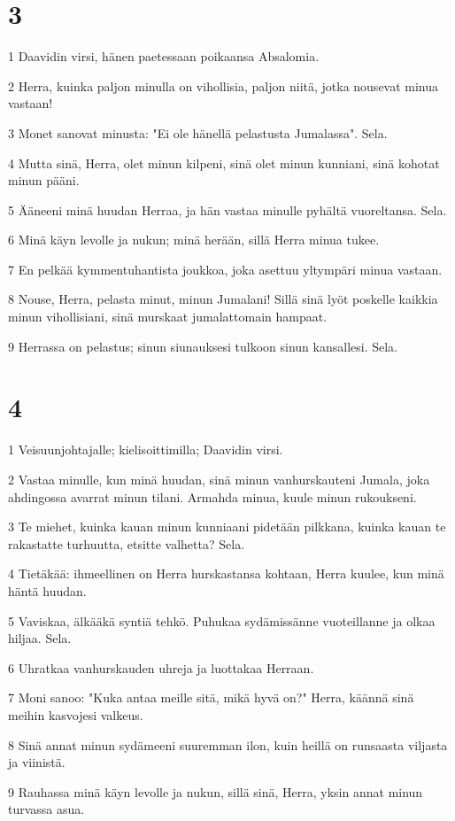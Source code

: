 \chapter{3}

\par 1 Daavidin virsi, hänen paetessaan poikaansa Absalomia.
\par 2 Herra, kuinka paljon minulla on vihollisia, paljon niitä, jotka nousevat minua vastaan!
\par 3 Monet sanovat minusta: "Ei ole hänellä pelastusta Jumalassa". Sela.
\par 4 Mutta sinä, Herra, olet minun kilpeni, sinä olet minun kunniani, sinä kohotat minun pääni.
\par 5 Ääneeni minä huudan Herraa, ja hän vastaa minulle pyhältä vuoreltansa. Sela.
\par 6 Minä käyn levolle ja nukun; minä herään, sillä Herra minua tukee.
\par 7 En pelkää kymmentuhantista joukkoa, joka asettuu yltympäri minua vastaan.
\par 8 Nouse, Herra, pelasta minut, minun Jumalani! Sillä sinä lyöt poskelle kaikkia minun vihollisiani, sinä murskaat jumalattomain hampaat.
\par 9 Herrassa on pelastus; sinun siunauksesi tulkoon sinun kansallesi. Sela.

\chapter{4}

\par 1 Veisuunjohtajalle; kielisoittimilla; Daavidin virsi.
\par 2 Vastaa minulle, kun minä huudan, sinä minun vanhurskauteni Jumala, joka ahdingossa avarrat minun tilani. Armahda minua, kuule minun rukoukseni.
\par 3 Te miehet, kuinka kauan minun kunniaani pidetään pilkkana, kuinka kauan te rakastatte turhuutta, etsitte valhetta? Sela.
\par 4 Tietäkää: ihmeellinen on Herra hurskastansa kohtaan, Herra kuulee, kun minä häntä huudan.
\par 5 Vaviskaa, älkääkä syntiä tehkö. Puhukaa sydämissänne vuoteillanne ja olkaa hiljaa. Sela.
\par 6 Uhratkaa vanhurskauden uhreja ja luottakaa Herraan.
\par 7 Moni sanoo: "Kuka antaa meille sitä, mikä hyvä on?" Herra, käännä sinä meihin kasvojesi valkeus.
\par 8 Sinä annat minun sydämeeni suuremman ilon, kuin heillä on runsaasta viljasta ja viinistä.
\par 9 Rauhassa minä käyn levolle ja nukun, sillä sinä, Herra, yksin annat minun turvassa asua.

